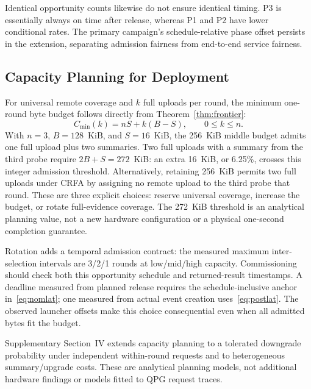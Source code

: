 \documentclass[10pt,journal]{IEEEtran}
\newcommand{\CRFA}{\textsc{CRFA}}
\begin{document}
Identical opportunity counts likewise do not ensure identical timing. P3 is
essentially always on time after release, whereas P1 and P2 have lower
conditional rates. The primary campaign's schedule-relative phase offset
persists in the extension, separating admission fairness from end-to-end
service fairness.

\subsection{Capacity Planning for Deployment}
\label{sec:deployment}
For universal remote coverage and $k$ full uploads per round, the minimum
one-round byte budget follows directly from Theorem~\ref{thm:frontier}:
\begin{equation}
C_{\min}(k)=nS+k(B-S),\qquad 0\leq k\leq n.
\label{eq:deployment_budget}
\end{equation}
With $n=3$, $B=128$~KiB, and $S=16$~KiB, the 256~KiB middle budget
admits one full upload plus two summaries. Two full uploads with a summary
from the third probe require $2B+S=272$~KiB: an extra 16~KiB, or 6.25\%,
crosses this integer admission threshold. Alternatively, retaining 256~KiB
permits two full uploads under \CRFA{} by assigning no remote upload to the
third probe that round. These are three explicit choices: reserve universal
coverage, increase the budget, or rotate full-evidence coverage. The 272~KiB
threshold is an analytical planning value, not a new hardware configuration
or a physical one-second completion guarantee.

Rotation adds a temporal admission contract: the measured maximum
inter-selection intervals are 3/2/1 rounds at low/mid/high capacity.
Commissioning should check both this opportunity schedule and returned-result
timestamps. A deadline measured from planned release requires the
schedule-inclusive anchor in~\eqref{eq:nomlat}; one measured from actual
event creation uses~\eqref{eq:postlat}. The observed launcher offsets make
this choice consequential even when all admitted bytes fit the budget.

Supplementary Section~IV extends capacity planning to a tolerated downgrade
probability under independent within-round requests and to heterogeneous
summary/upgrade costs. These are analytical planning models, not additional
hardware findings or models fitted to QPG request traces.
\end{document}
